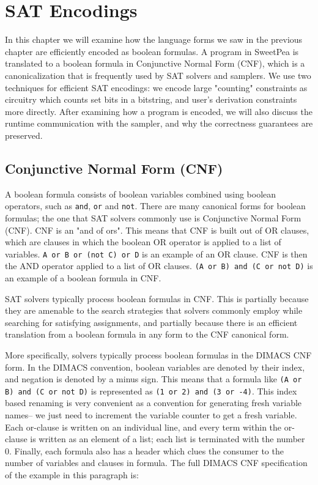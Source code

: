 
\chapter{SAT Encodings}

In this chapter we will examine how the language forms we saw in the previous chapter are efficiently encoded as boolean formulas. A program in SweetPea is translated to a boolean formula in Conjunctive Normal Form (CNF), which is a canonicalization that is frequently used by SAT solvers and samplers. We use two techniques for efficient SAT encodings: we encode large "counting" constraints as circuitry which counts set bits in a bitstring, and user's derivation constraints more directly. After examining how a program is encoded, we will also discuss the runtime communication with the sampler, and why the correctness guarantees are preserved.

\section{Conjunctive Normal Form (CNF)}

A boolean formula consists of boolean variables combined using boolean operators, such as \texttt{and}, \texttt{or} and \texttt{not}. There are many canonical forms for boolean formulas; the one that SAT solvers commonly use is Conjunctive Normal Form (CNF). CNF is an "and of ors". This means that CNF is built out of OR clauses, which are clauses in which the boolean OR operator is applied to a list of variables. \texttt{A or B or (not C) or D} is an example of an OR clause. CNF is then the AND operator applied to a list of OR clauses. \texttt{(A or B) and (C or not D)} is an example of a boolean formula in CNF.

SAT solvers typically process boolean formulas in CNF. This is partially because they are amenable to the search strategies that solvers commonly employ while searching for satisfying assignments, and partially because there is an efficient translation from a boolean formula in any form to the CNF canonical form.

More specifically, solvers typically process boolean formulas in the DIMACS CNF form. In the DIMACS convention, boolean variables are denoted by their index, and negation is denoted by a minus sign. This means that a formula like \texttt{(A or B) and (C or not D)} is represented as \texttt{(1 or 2) and (3 or -4)}. This index based renaming is very convenient as a convention for generating fresh variable names-- we just need to increment the variable counter to get a fresh variable. Each or-clause is written on an individual line, and every term within the or-clause is written as an element of a list; each list is terminated with the number 0. Finally, each formula also has a header which clues the consumer to the number of variables and clauses in formula. The full DIMACS CNF specification of the example in this paragraph is:


